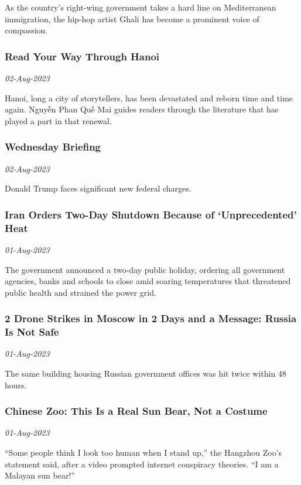As the country’s right-wing government takes a hard line on Mediterranean immigration, the hip-hop artist Ghali has become a prominent voice of compassion.
\subsubsection{Read Your Way Through Hanoi \href{https://www.nytimes.com/2023/08/02/books/hanoi-vietnam-books.html}{}}
\textit{02-Aug-2023}

Hanoi, long a city of storytellers, has been devastated and reborn time and time again. Nguyễn Phan Quế Mai guides readers through the literature that has played a part in that renewal.
\subsubsection{Wednesday Briefing \href{https://www.nytimes.com/2023/08/02/briefing/trump-indictment-niger-evacuations.html}{}}
\textit{02-Aug-2023}

Donald Trump faces significant new federal charges.
\subsubsection{Iran Orders Two-Day Shutdown Because of ‘Unprecedented’ Heat \href{https://www.nytimes.com/2023/08/01/world/middleeast/iran-heat-shutdown.html}{}}
\textit{01-Aug-2023}

The government announced a two-day public holiday, ordering all government agencies, banks and schools to close amid soaring temperatures that threatened public health and strained the power grid.
\subsubsection{2 Drone Strikes in Moscow in 2 Days and a Message: Russia Is Not Safe \href{https://www.nytimes.com/2023/08/01/world/europe/moscow-drone-attack-ukraine.html}{}}
\textit{01-Aug-2023}

The same building housing Russian government offices was hit twice within 48 hours.
\subsubsection{Chinese Zoo: This Is a Real Sun Bear, Not a Costume \href{https://www.nytimes.com/2023/08/01/world/asia/chinese-zoo-sun-bear-costume.html}{}}
\textit{01-Aug-2023}

“Some people think I look too human when I stand up,” the Hangzhou Zoo’s statement said, after a video prompted internet conspiracy theories. “I am a Malayan sun bear!”
